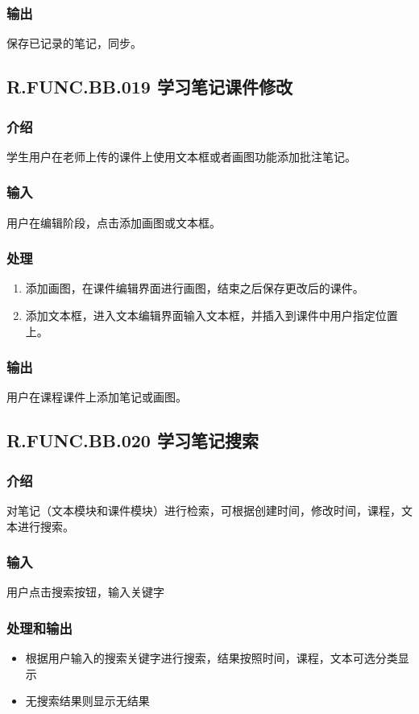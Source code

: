     \subsubsection{输出}
	  保存已记录的笔记，同步。

  \subsection{R.FUNC.BB.019 学习笔记课件修改}
    \subsubsection{介绍}
	   学生用户在老师上传的课件上使用文本框或者画图功能添加批注笔记。
    \subsubsection{输入}
	   用户在编辑阶段，点击添加画图或文本框。
    \subsubsection{处理}
    \begin{enumerate}
      \item 添加画图，在课件编辑界面进行画图，结束之后保存更改后的课件。
      \item 添加文本框，进入文本编辑界面输入文本框，并插入到课件中用户指定位置上。
    \end{enumerate}
    \subsubsection{输出}
	   用户在课程课件上添加笔记或画图。

 \subsection{R.FUNC.BB.020 学习笔记搜索}
    \subsubsection{介绍}
	   对笔记（文本模块和课件模块）进行检索，可根据创建时间，修改时间，课程，文本进行搜索。
    \subsubsection{输入}
	   用户点击搜索按钮，输入关键字
    \subsubsection{处理和输出}
    \begin{itemize}
      \item 根据用户输入的搜索关键字进行搜索，结果按照时间，课程，文本可选分类显示
      \item 无搜索结果则显示无结果
    \end{itemize}

